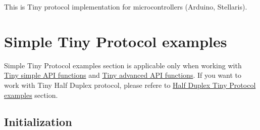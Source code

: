 This is Tiny protocol implementation for microcontrollers (Arduino, Stellaris).\hypertarget{arduino_arduino_tiny}{}\section{Simple Tiny Protocol examples}\label{arduino_arduino_tiny}
Simple Tiny Protocol examples section is applicable only when working with \hyperlink{group__SIMPLE__API}{Tiny simple A\+P\+I functions} and \hyperlink{group__ADVANCED__API}{Tiny advanced A\+P\+I functions}. If you want to work with Tiny Half Duplex protocol, please refere to \hyperlink{arduino_arduino_tiny_hd}{Half Duplex Tiny Protocol examples} section.\hypertarget{arduino_arduino_tiny_init}{}\subsection{Initialization}\label{arduino_arduino_tiny_init}

